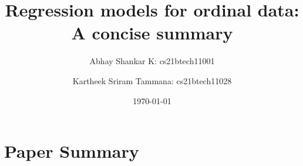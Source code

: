 \documentclass[reqno]{amsart}
\begin{document}
    \title{Regression models for ordinal data: A concise summary}
    \author{Abhay Shankar K: cs21btech11001}
    \author{Kartheek Sriram Tammana: cs21btech11028}
    \date{\today}
    
    \maketitle

    \section{Paper Summary}



            




\end{document}
